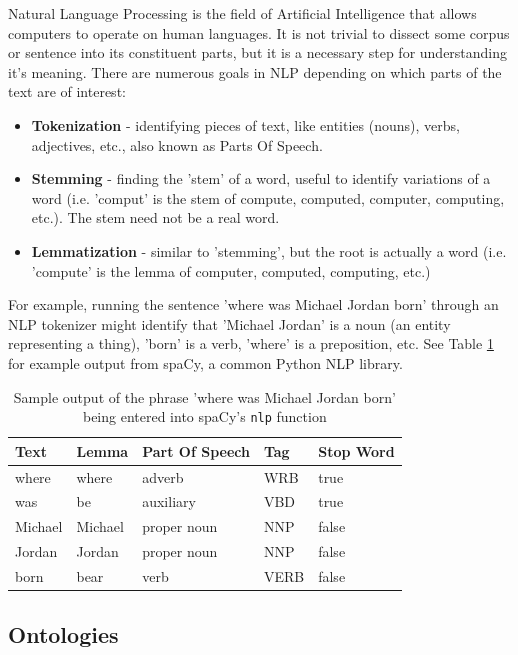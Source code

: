 \documentclass[sigplan,screen]{acmart}
\begin{document}
Natural Language Processing is the field of Artificial Intelligence that allows computers to operate on human languages. It is not trivial to dissect some corpus or sentence into its constituent parts, but it is a necessary step for understanding it's meaning. There are numerous goals in NLP depending on which parts of the text are of interest:
\begin{itemize}
    \item \textbf{Tokenization} - identifying pieces of text, like entities (nouns), verbs, adjectives, etc., also known as Parts Of Speech.
    \item \textbf{Stemming} - finding the 'stem' of a word, useful to identify variations of a word (i.e. 'comput' is the stem of compute, computed, computer, computing, etc.). The stem need not be a real word.
    \item \textbf{Lemmatization} - similar to 'stemming', but the root is actually a word (i.e. 'compute' is the lemma of computer, computed, computing, etc.)
\end{itemize}

For example, running the sentence 'where was Michael Jordan born' through an NLP tokenizer might identify that 'Michael Jordan' is a noun (an entity representing a thing), 'born' is a verb, 'where' is a preposition, etc. See Table \ref{table:tokenization} for example output from spaCy, a common Python NLP library.

\begin{table}[]
\caption{Sample output of the phrase 'where was Michael Jordan born' being entered into spaCy's \texttt{nlp} function}
\label{table:tokenization}
\begin{tabular}{|l|l|l|l|l|}
\hline
Text    & Lemma   & Part Of Speech & Tag  & Stop Word \\ \hline
where   & where   & adverb         & WRB  & true      \\ \hline
was     & be      & auxiliary      & VBD  & true      \\ \hline
Michael & Michael & proper noun    & NNP  & false     \\ \hline
Jordan  & Jordan  & proper noun    & NNP  & false     \\ \hline
born    & bear    & verb           & VERB & false     \\ \hline
\end{tabular}
\end{table}

\subsection{Ontologies}
\end{document}
